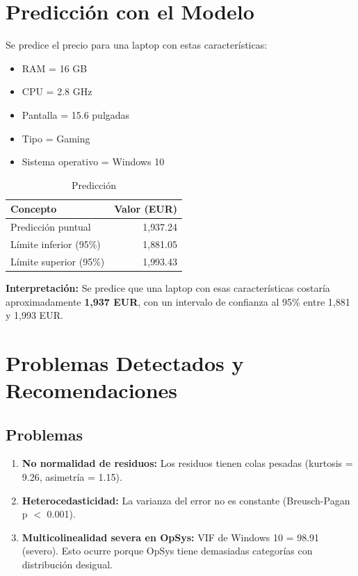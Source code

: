 \documentclass[12pt,a4paper]{article}
\begin{document}
\section{Predicción con el Modelo}

Se predice el precio para una laptop con estas características:
\begin{itemize}
    \item RAM = 16 GB
    \item CPU = 2.8 GHz
    \item Pantalla = 15.6 pulgadas
    \item Tipo = Gaming
    \item Sistema operativo = Windows 10
\end{itemize}

\begin{table}[H]
\centering
\caption{Predicción}
\begin{tabular}{lr}
\toprule
\textbf{Concepto} & \textbf{Valor (EUR)} \\
\midrule
Predicción puntual & 1{,}937.24 \\
Límite inferior (95\%) & 1{,}881.05 \\
Límite superior (95\%) & 1{,}993.43 \\
\bottomrule
\end{tabular}
\end{table}

\textbf{Interpretación:} Se predice que una laptop con esas características costaría aproximadamente \textbf{1,937 EUR}, con un intervalo de confianza al 95\% entre 1,881 y 1,993 EUR.

\section{Problemas Detectados y Recomendaciones}

\subsection{Problemas}

\begin{enumerate}
    \item \textbf{No normalidad de residuos:} Los residuos tienen colas pesadas (kurtosis = 9.26, asimetría = 1.15).
    
    \item \textbf{Heterocedasticidad:} La varianza del error no es constante (Breusch-Pagan p $<$ 0.001).
    
    \item \textbf{Multicolinealidad severa en OpSys:} VIF de Windows 10 = 98.91 (severo). Esto ocurre porque OpSys tiene demasiadas categorías con distribución desigual.
\end{enumerate}
\end{document}
